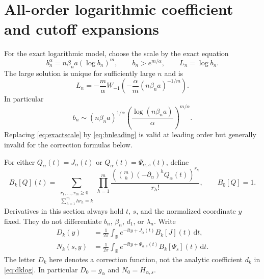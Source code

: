 \documentclass[11pt,a4paper]{article}
\numberwithin{equation}{section}
\theoremstyle{definition}\newtheorem{definition}[theorem]{Definition}
\theoremstyle{remark}\newtheorem{remark}[theorem]{Remark}
\theoremstyle{definition}
\newcommand{\R}{\mathbb R}\newcommand{\C}{\mathbb C}
\newcommand{\dd}{\,\mathrm d}
\begin{document}
\section{All-order logarithmic coefficient and cutoff expansions}
\label{sec:allorders}

For the exact logarithmic model, choose the scale by the exact equation
\begin{equation}\label{eq:exactscale}
 b_n^\alpha=n\beta_n a(\log b_n)^m,\qquad b_n>e^{m/\alpha},
 \qquad L_n=\log b_n.
\end{equation}
The large solution is unique for sufficiently large $n$ and is
\begin{equation}\label{eq:bnLambert}
 L_n=-\frac m\alpha W_{-1}\!\left(
    -\frac\alpha m(n\beta_n a)^{-1/m}\right).
\end{equation}
In particular
\begin{equation}\label{eq:bnleading}
 b_n\sim(n\beta_n a)^{1/\alpha}
       \left(\frac{\log(n\beta_n a)}\alpha\right)^{m/\alpha}.
\end{equation}
Replacing \eqref{eq:exactscale} by \eqref{eq:bnleading} is valid at leading
order but generally invalid for the correction formulas below.

For either $Q_\alpha(t)=J_\alpha(t)$ or
$Q_\alpha(t)=\Psi_{\alpha,s}(t)$, define
\begin{equation}\label{eq:Bbell}
 B_k[Q](t)=
 \sum_{\substack{r_1,\ldots,r_m\ge0\\\sum_{h=1}^m h r_h=k}}
 \prod_{h=1}^m\frac{\left(\binom mh(-\partial_\alpha)^h Q_\alpha(t)
                      \right)^{r_h}}{r_h!},
 \qquad B_0[Q]=1.
\end{equation}
Derivatives in this section always hold $t$, $s$, and the normalized
coordinate $y$ fixed. They do not differentiate $b_n$, $\beta_n$, $d_1$,
or $\lambda_n$.
Write
\begin{align}
 D_k(y)&=\frac1{2\pi}\int_\R e^{-\ii ty+J_\alpha(t)}B_k[J](t)\dd t,
 \label{eq:Dk}\\
 N_k(s,y)&=\frac1{2\pi}\int_\R
                 e^{-\ii ty+\Psi_{\alpha,s}(t)}B_k[\Psi_s](t)\dd t.
 \label{eq:Nk}
\end{align}
The letter $D_k$ here denotes a correction function, not the analytic
coefficient $d_k$ in \eqref{eq:dklog}. In particular $D_0=g_\alpha$ and
$N_0=H_{\alpha,s}$.
\end{document}
